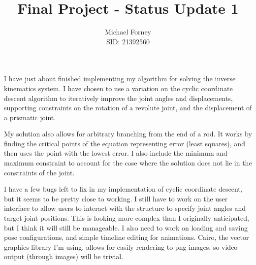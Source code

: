 \documentclass{article}
\title{Final Project - Status Update 1}
\author{Michael Forney \\ SID: 21392560}
\begin{document}
    \maketitle
    \doublespacing

    I have just about finished implementing my algorithm for solving the
    inverse kinematics system. I have chosen to use a variation on the cyclic
    coordinate descent algorithm to iteratively improve the joint angles and
    displacements, supporting constraints on the rotation of a revolute joint,
    and the displacement of a prismatic joint.

    My solution also allows for arbitrary branching from the end of a rod. It
    works by finding the critical points of the equation representing error
    (least squares), and then uses the point with the lowest error. I also
    include the minimum and maximum constraint to account for the case where
    the solution does not lie in the constraints of the joint.

    I have a few bugs left to fix in my implementation of cyclic coordinate
    descent, but it seems to be pretty close to working. I still have to work
    on the user interface to allow users to interact with the structure to
    specify joint angles and target joint positions. This is looking more
    complex than I originally anticipated, but I think it will still be
    manageable. I also need to work on loading and saving pose configurations,
    and simple timeline editing for animations. Cairo, the vector graphics
    library I'm using, allows for easily rendering to png images, so video
    output (through images) will be trivial.
\end{document}
